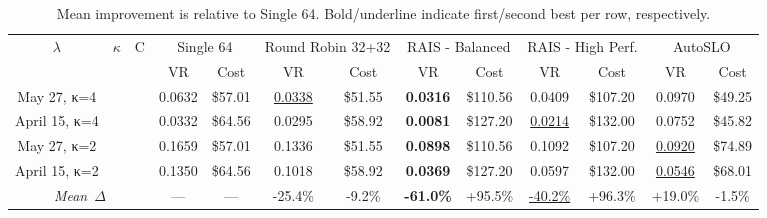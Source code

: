 \documentclass{article}
\begin{document}
\begin{table}[t]
\centering
\footnotesize
\setlength{\tabcolsep}{2.5pt}
\caption{Mean improvement is relative to Single 64. Bold/underline indicate first/second best per row, respectively.}\label{tab:todo}
\begin{tabular}{c c c || c c | c c | c c | c c | c c}
\toprule
$\lambda$ & $\kappa$ & C & \multicolumn{2}{c|}{Single 64} & \multicolumn{2}{c|}{Round Robin 32+32} & \multicolumn{2}{c|}{RAIS - Balanced} & \multicolumn{2}{c|}{RAIS - High Perf.} & \multicolumn{2}{c}{AutoSLO} \\
 &  &  & VR & Cost & VR & Cost & VR & Cost & VR & Cost & VR & Cost \\
\hline
May 27, κ=4 &  &  & 0.0632 & \$57.01 & \underline{0.0338} & \$51.55 & \textbf{0.0316} & \$110.56 & 0.0409 & \$107.20 & 0.0970 & \$49.25 \\
April 15, κ=4 &  &  & 0.0332 & \$64.56 & 0.0295 & \$58.92 & \textbf{0.0081} & \$127.20 & \underline{0.0214} & \$132.00 & 0.0752 & \$45.82 \\
May 27, κ=2 &  &  & 0.1659 & \$57.01 & 0.1336 & \$51.55 & \textbf{0.0898} & \$110.56 & 0.1092 & \$107.20 & \underline{0.0920} & \$74.89 \\
April 15, κ=2 &  &  & 0.1350 & \$64.56 & 0.1018 & \$58.92 & \textbf{0.0369} & \$127.20 & 0.0597 & \$132.00 & \underline{0.0546} & \$68.01 \\
\hline
\multicolumn{3}{c||}{\textit{Mean~$\Delta$}} & --- & --- & -25.4\% & -9.2\% & \textbf{-61.0\%} & +95.5\% & \underline{-40.2\%} & +96.3\% & +19.0\% & -1.5\% \\
\bottomrule
\end{tabular}
\end{table}
\end{document}
